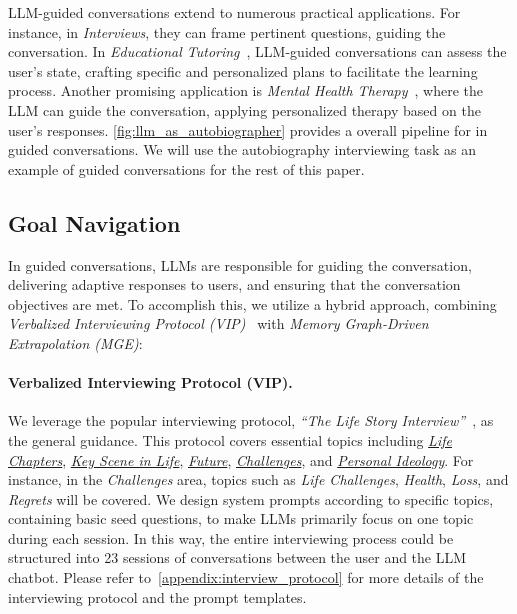 LLM-guided conversations extend to numerous practical applications. For instance, in {\textit{Interviews}}, they can frame pertinent questions, guiding the conversation. In {\textit{Educational Tutoring}}~\cite{nye2023generative}, LLM-guided conversations can assess the user's state, crafting specific and personalized plans to facilitate the learning process. Another promising application is {\textit{Mental Health Therapy}}~\cite{demszky2023using,hong2024conect}, where the LLM can guide the conversation, applying personalized therapy based on the user's responses. \cref{fig:llm_as_autobiographer} provides a overall pipeline for \methodname in guided conversations. We will use the autobiography interviewing task as an example of guided conversations for the rest of this paper.

\subsection{Goal Navigation}
In guided conversations, LLMs are responsible for guiding the conversation, delivering adaptive responses to users, and ensuring that the conversation objectives are met.
To accomplish this, we utilize a hybrid approach, combining \textit{Verbalized Interviewing Protocol (VIP)}~\cite{2016maunsell,castillo2016preparing,lamb2007structured} with \textit{Memory Graph-Driven Extrapolation (MGE)}:


\paragraph{Verbalized Interviewing Protocol (VIP).} We leverage the popular interviewing protocol, \textit{``The Life Story Interview''}~\cite{mcadams2008life}, as the general guidance. 
This protocol covers essential topics including \underline{\textit{Life Chapters}}, \underline{\textit{Key Scene in Life}}, \underline{\textit{Future}}, \underline{\textit{Challenges}}, and \underline{\textit{Personal Ideology}}. For instance, in the \textit{Challenges} area, topics such as \textit{Life Challenges}, \textit{Health}, \textit{Loss}, and \textit{Regrets} will be covered. We design system prompts according to specific topics, containing basic seed questions, to make LLMs primarily focus on one topic during each session. In this way, the entire interviewing process could be structured into 23 sessions of conversations between the user and the LLM chatbot. 
Please refer to~\cref{appendix:interview_protocol} for more details of the interviewing protocol and the prompt templates.

